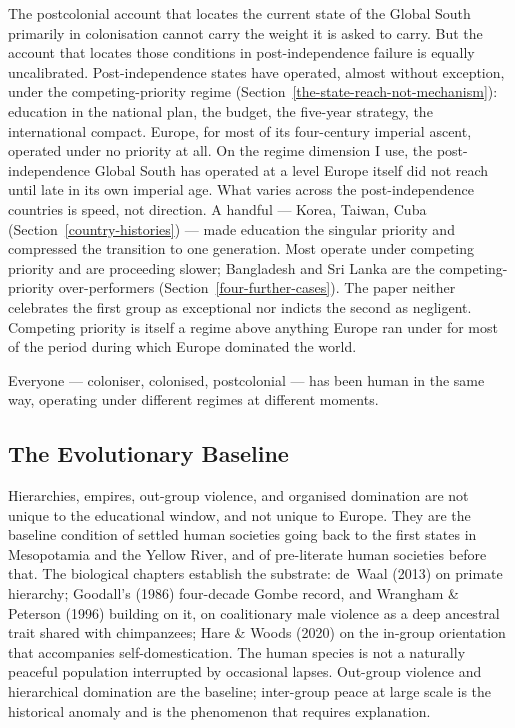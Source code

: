 \documentclass[12pt,letterpaper]{article}
\begin{document}
The postcolonial account that locates the current state of the Global
South primarily in colonisation cannot carry the weight it is asked to
carry. But the account that locates those conditions in
post-independence failure is equally uncalibrated. Post-independence
states have operated, almost without exception, under the
competing-priority regime
(Section~\ref{the-state-reach-not-mechanism}): education in the
national plan, the budget, the five-year strategy, the international
compact. Europe, for most of its four-century imperial ascent,
operated under no priority at all. On the regime dimension I
use, the post-independence Global South has operated at a level
Europe itself did not reach until late in its own imperial age. What
varies across the post-independence countries is speed, not direction.
A handful --- Korea, Taiwan, Cuba
(Section~\ref{country-histories}) --- made education the singular priority and
compressed the transition to one generation. Most operate under
competing priority and are proceeding slower; Bangladesh and Sri Lanka
are the competing-priority over-performers
(Section~\ref{four-further-cases}). The paper neither
celebrates the first group as exceptional nor indicts the second as
negligent. Competing priority is itself a regime above anything Europe
ran under for most of the period during which Europe dominated the
world.

Everyone --- coloniser, colonised, postcolonial --- has been human in
the same way, operating under different regimes at different moments.

\subsection{The Evolutionary Baseline}\label{the-evolutionary-baseline}

Hierarchies, empires, out-group violence, and organised domination are
not unique to the educational window, and not unique to Europe. They
are the baseline condition of settled human societies going back to
the first states in Mesopotamia and the Yellow River, and of
pre-literate human societies before that. The biological chapters
establish the substrate: de~Waal (2013) on primate hierarchy;
Goodall's (1986) four-decade Gombe record, and Wrangham
\& Peterson (1996) building on it, on coalitionary male violence as a
deep ancestral trait shared with chimpanzees; Hare \& Woods (2020) on
the in-group orientation that accompanies self-domestication. The human species is not a naturally peaceful
population interrupted by occasional lapses. Out-group violence and
hierarchical domination are the baseline; inter-group peace at large
scale is the historical anomaly and is the phenomenon that requires
explanation.
\end{document}
